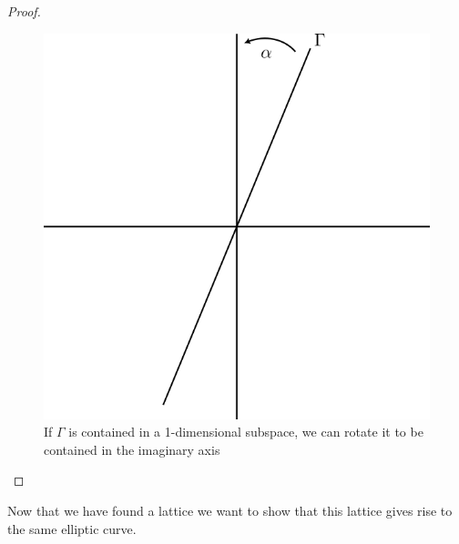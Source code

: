 \begin{proof}
    \begin{figure}[ht]
        \centering
        \includegraphics[scale=0.8]{Images/Gamma_in_1_dim_space.png}
        \caption{If $\Gamma$ is contained in a 1-dimensional subspace, we can rotate it to be contained in the imaginary axis}
        \label{fig:Gamma-in-1-dim-subspace}
    \end{figure}
\end{proof}

Now that we have found a lattice we want to show that this lattice gives rise to the same elliptic curve.

